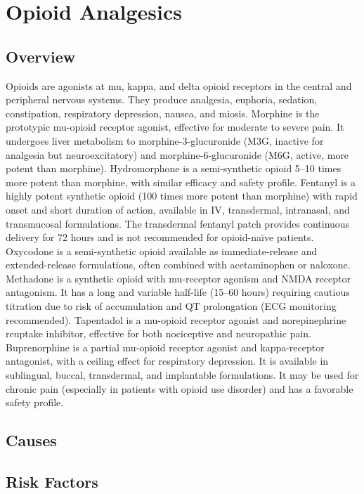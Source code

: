 \chapter{Opioid Analgesics}
\label{sec:Opioid Analgesics}

\section{Overview}
Opioids are agonists at mu, kappa, and delta opioid receptors in the central and peripheral nervous systems. They produce analgesia, euphoria, sedation, constipation, respiratory depression, nausea, and miosis. Morphine is the prototypic mu-opioid receptor agonist, effective for moderate to severe pain. It undergoes liver metabolism to morphine-3-glucuronide (M3G, inactive for analgesia but neuroexcitatory) and morphine-6-glucuronide (M6G, active, more potent than morphine). Hydromorphone is a semi-synthetic opioid 5--10 times more potent than morphine, with similar efficacy and safety profile. Fentanyl is a highly potent synthetic opioid (100 times more potent than morphine) with rapid onset and short duration of action, available in IV, transdermal, intranasal, and transmucosal formulations. The transdermal fentanyl patch provides continuous delivery for 72 hours and is not recommended for opioid-na{\"i}ve patients. Oxycodone is a semi-synthetic opioid available as immediate-release and extended-release formulations, often combined with acetaminophen or naloxone. Methadone is a synthetic opioid with mu-receptor agonism and NMDA receptor antagonism. It has a long and variable half-life (15--60 hours) requiring cautious titration due to risk of accumulation and QT prolongation (ECG monitoring recommended). Tapentadol is a mu-opioid receptor agonist and norepinephrine reuptake inhibitor, effective for both nociceptive and neuropathic pain. Buprenorphine is a partial mu-opioid receptor agonist and kappa-receptor antagonist, with a ceiling effect for respiratory depression. It is available in sublingual, buccal, transdermal, and implantable formulations. It may be used for chronic pain (especially in patients with opioid use disorder) and has a favorable safety profile.
\section{Causes}
\section{Risk Factors}

